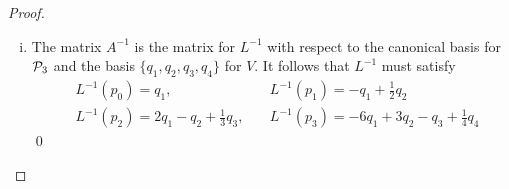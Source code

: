 \begin{proof}
\begin{enumerate}[(i)]
        \item The matrix $A^{-1}$ is the matrix for $L^{-1}$ with respect to the canonical basis for $\P_3$ and the basis $\{q_1,q_2,q_3,q_4\}$ for $V$.
        It follows that $L^{-1}$ must satisfy 
        \[
            \begin{aligned}
                &L^{-1}(p_0)=q_1,\ &&L^{-1}(p_1)=-q_1+\frac{1}{2}q_2\\ 
                &L^{-1}(p_2)=2q_1-q_2+\frac{1}{3}q_3,\ &&L^{-1}(p_3)=-6q_1+3q_2-q_3+\frac{1}{4}q_4
            \end{aligned}
        \]\qed
    \end{enumerate}
    \renewcommand{\qedsymbol}{}
\end{proof}